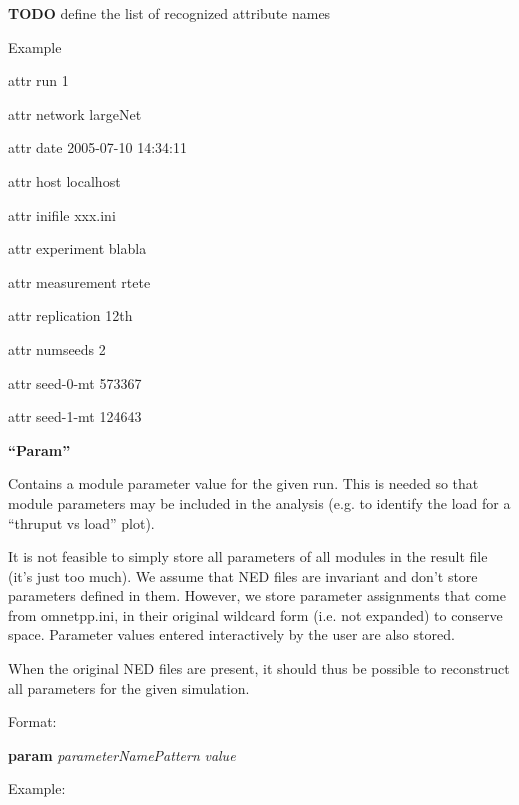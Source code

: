 \bigskip

\textbf{TODO} define the list of recognized attribute names


\bigskip

Example

{\ttfamily
attr run 1}

{\ttfamily
attr network {\textquotedbl}largeNet{\textquotedbl} }

{\ttfamily
attr date {\textquotedbl}2005{}-07{}-10 14:34:11{\textquotedbl}}

{\ttfamily
attr host {\textquotedbl}localhost{\textquotedbl} }

{\ttfamily
attr inifile {\textquotedbl}xxx.ini{\textquotedbl}}

{\ttfamily
attr experiment {\textquotedbl}blabla{\textquotedbl} }

{\ttfamily
attr measurement {\textquotedbl}rtete{\textquotedbl} }

{\ttfamily
attr replication {\textquotedbl}12th{\textquotedbl}}

{\ttfamily
attr numseeds 2 }

{\ttfamily
attr seed{}-0{}-mt 573367}

{\ttfamily
attr seed{}-1{}-mt 124643}


\bigskip

{\bfseries
``Param''}

Contains a module parameter value for the given run. This is needed so
that module parameters may be included in the analysis (e.g. to
identify the load for a ``thruput vs load'' plot).


\bigskip

It is not feasible to simply store all parameters of all modules in the
result file (it's just too much). We assume that NED files are
invariant and don't store parameters defined in them. However, we store
parameter assignments that come from omnetpp.ini, in their original
wildcard form (i.e. not expanded) to conserve space. Parameter values
entered interactively by the user are also stored.


\bigskip

When the original NED files are present, it should thus be possible to
reconstruct all parameters for the given simulation.



Format:

\textbf{param} \textit{parameterNamePattern} \textit{value}


\bigskip

Example:

